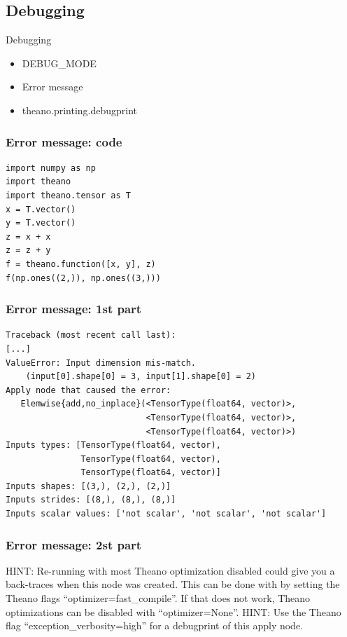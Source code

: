 \documentclass[utf8x,xcolor=pdftex,dvipsnames,table]{beamer}
\begin{document}
\subsection{Debugging}
\begin{frame}{Debugging}
  \begin{itemize}
  \item DEBUG\_MODE
  \item Error message
  \item theano.printing.debugprint
  \end{itemize}
\end{frame}

\begin{frame}[fragile]
  \frametitle{Error message: code}
\begin{lstlisting}
import numpy as np
import theano
import theano.tensor as T
x = T.vector()
y = T.vector()
z = x + x
z = z + y
f = theano.function([x, y], z)
f(np.ones((2,)), np.ones((3,)))
\end{lstlisting}
\end{frame}

\begin{frame}[fragile]
  \frametitle{Error message: 1st part}

\begin{lstlisting}
Traceback (most recent call last):
[...]
ValueError: Input dimension mis-match.
    (input[0].shape[0] = 3, input[1].shape[0] = 2)
Apply node that caused the error:
   Elemwise{add,no_inplace}(<TensorType(float64, vector)>,
                            <TensorType(float64, vector)>,
                            <TensorType(float64, vector)>)
Inputs types: [TensorType(float64, vector),
               TensorType(float64, vector),
               TensorType(float64, vector)]
Inputs shapes: [(3,), (2,), (2,)]
Inputs strides: [(8,), (8,), (8,)]
Inputs scalar values: ['not scalar', 'not scalar', 'not scalar']
\end{lstlisting}
\end{frame}

\begin{frame}[fragile]
  \frametitle{Error message: 2st part}
HINT: Re-running with most Theano optimization
disabled could give you a back-traces when this
node was created. This can be done with by setting
the Theano flags ``optimizer=fast\_compile''. If that does not
work, Theano optimizations can be disabled with
``optimizer=None''.\newline
HINT: Use the Theano flag ``exception\_verbosity=high''
for a debugprint of this apply node.
\end{frame}
\end{document}
